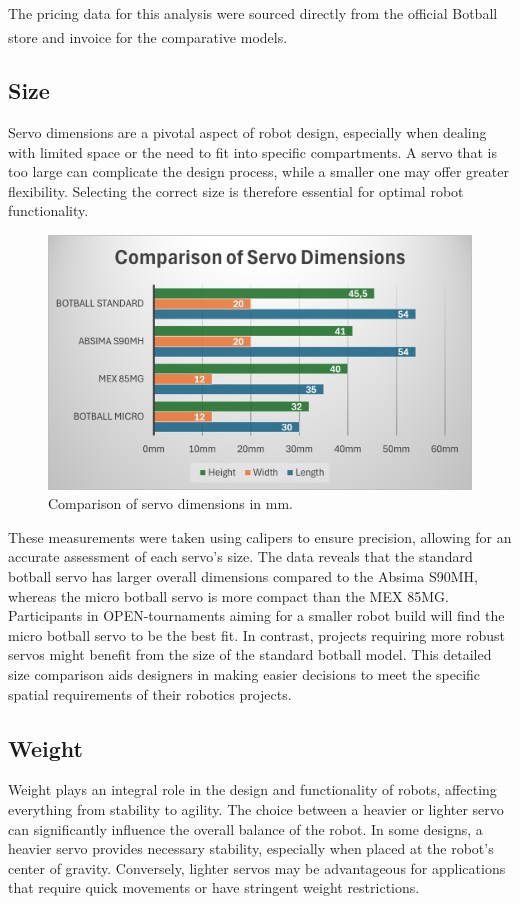 \documentclass[conference]{IEEEtran}
\begin{document}
The pricing data for this analysis were sourced directly from the official Botball store\textsuperscript{\cite{b1, b2}} and invoice for the comparative models.

\subsection{Size}
Servo dimensions are a pivotal aspect of robot design, especially when dealing with limited space or the need to fit into specific compartments. A servo that is too large can complicate the design process, while a smaller one may offer greater flexibility. Selecting the correct size is therefore essential for optimal robot functionality.

\begin{figure}[H]
\centering
\includegraphics[width=\linewidth]{dimension_comparison_chart.png}
\caption{Comparison of servo dimensions in mm.}
\label{fig:dimension_comparison}
\end{figure}

These measurements were taken using calipers to ensure precision, allowing for an accurate assessment of each servo's size. The data reveals that the standard botball servo has larger overall dimensions compared to the Absima S90MH, whereas the micro botball servo is more compact than the MEX 85MG. Participants in OPEN-tournaments aiming for a smaller robot build will find the micro botball servo to be the best fit. In contrast, projects requiring more robust servos might benefit from the size of the standard botball model. This detailed size comparison aids designers in making easier decisions to meet the specific spatial requirements of their robotics projects.

\subsection{Weight}
Weight plays an integral role in the design and functionality of robots, affecting everything from stability to agility. The choice between a heavier or lighter servo can significantly influence the overall balance of the robot. In some designs, a heavier servo provides necessary stability, especially when placed at the robot's center of gravity. Conversely, lighter servos may be advantageous for applications that require quick movements or have stringent weight restrictions.
\end{document}
